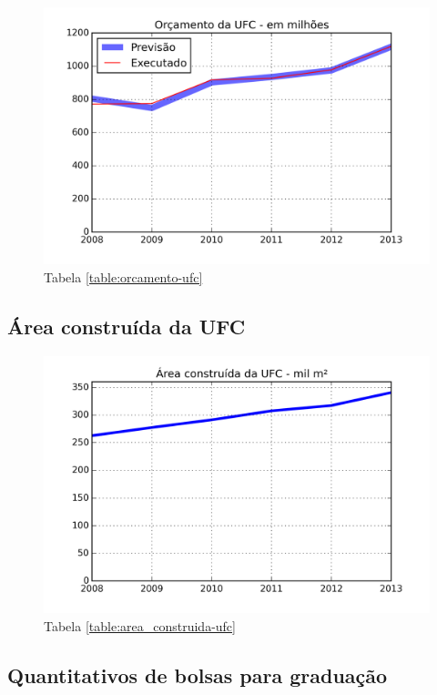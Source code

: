 \documentclass{report}
\begin{document}
\begin{figure}[H]
	\includegraphics{img/orcamento_ufc.png}
	\caption{Tabela \ref{table:orcamento-ufc}}
	\label{img:orcamento-ufc}
\end{figure}

\subsection{Área construída da UFC}

\begin{figure}[H]
	\includegraphics{img/area_construida_ufc.png}
	\caption{Tabela \ref{table:area_construida-ufc}}
	\label{img:area_construida-ufc}
\end{figure}


\subsection{Quantitativos de bolsas para graduação}
\end{document}
